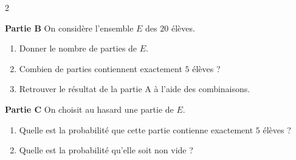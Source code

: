 \documentclass{article}
\begin{document}
\begin{paracol}{2}
{    \textbf{Partie B}
    On considère l'ensemble $E$ des $20$ élèves.
    \begin{enumerate}
        \item Donner le nombre de parties de $E$.
        \item Combien de parties contiennent exactement $5$ élèves ?
        \item Retrouver le résultat de la partie A à l'aide des combinaisons.
    \end{enumerate}
    
    \textbf{Partie C}
    On choisit au hasard une partie de $E$.
    \begin{enumerate}
        \item Quelle est la probabilité que cette partie contienne exactement $5$ élèves ?
        \item Quelle est la probabilité qu'elle soit non vide ?
    \end{enumerate}
}

\switchcolumn

\end{paracol}
\end{document}

